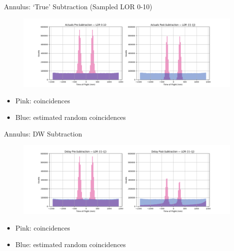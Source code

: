 \documentclass[pdf]{beamer}
\begin{document}
\begin{frame}{Annulus: `True' Subtraction (Sampled LOR 0-10)}
    \begin{figure}
        \centering
        \includegraphics[width=\textwidth]{figures/0_10_actual.png}
    \end{figure}

    \begin{itemize}
        \item Pink: coincidences
        \item Blue: estimated random coincidences
    \end{itemize}
\end{frame}

\begin{frame}{Annulus: DW Subtraction}
    \begin{figure}
        \centering
        \includegraphics[width=\textwidth]{figures/0_10_delay.png}
    \end{figure}
    \begin{itemize}
        \item Pink: coincidences
        \item Blue: estimated random coincidences
    \end{itemize}
\end{frame}
\end{document}

